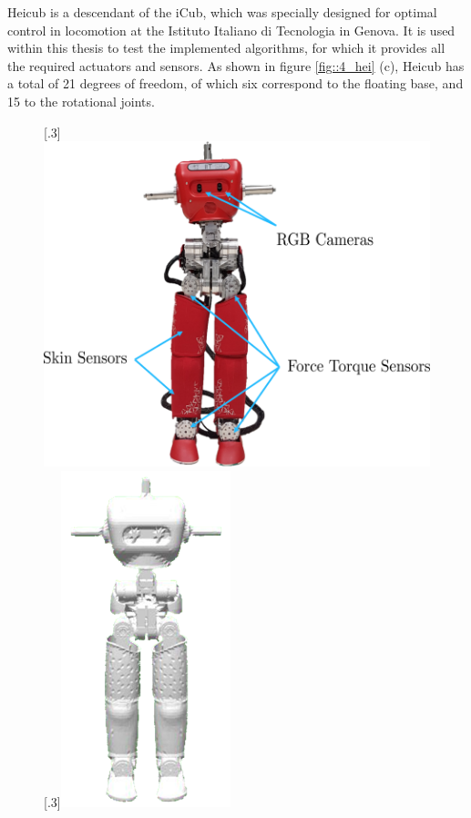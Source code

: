 \label{sec::4_he}
Heicub is a descendant of the iCub, which was specially designed for optimal control in locomotion at the Istituto Italiano di Tecnologia in Genova. It is used within this thesis to test the implemented algorithms, for which it provides all the required actuators and sensors. As shown in figure \ref{fig::4_hei} (c), Heicub has a total of 21 degrees of freedom, of which six correspond to the floating base, and 15 to the rotational joints. 
\begin{figure}[h!]
	\centering
	[.3\linewidth]{\includegraphics[scale=.35]{chapters/05_heicub_our_humanoid_robot/img/heicub.png}}
	[.3\linewidth]{\includegraphics[scale=.35]{chapters/05_heicub_our_humanoid_robot/img/gazebo_heicub.png}}

\end{figure}

